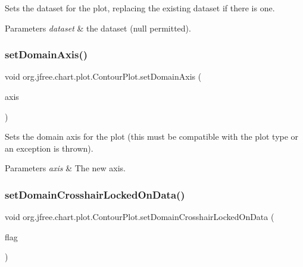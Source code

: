 Sets the dataset for the plot, replacing the existing dataset if there is one.


\begin{DoxyParams}{Parameters}
{\em dataset} & the dataset ({\ttfamily null} permitted). \\
\hline
\end{DoxyParams}
\mbox{\label{classorg_1_1jfree_1_1chart_1_1plot_1_1_contour_plot_a9daa2294c4efa2a5e58fafc7c6e723a5}} 
\subsubsection{\texorpdfstring{set\+Domain\+Axis()}{setDomainAxis()}}
{\footnotesize\ttfamily void org.\+jfree.\+chart.\+plot.\+Contour\+Plot.\+set\+Domain\+Axis (\begin{DoxyParamCaption}\item[{\mbox{\hyperlink{classorg_1_1jfree_1_1chart_1_1axis_1_1_value_axis}{Value\+Axis}}}]{axis }\end{DoxyParamCaption})}

Sets the domain axis for the plot (this must be compatible with the plot type or an exception is thrown).


\begin{DoxyParams}{Parameters}
{\em axis} & The new axis. \\
\hline
\end{DoxyParams}
\mbox{\label{classorg_1_1jfree_1_1chart_1_1plot_1_1_contour_plot_aa2c25a282ecd66b55e4420483bac346a}} 
\subsubsection{\texorpdfstring{set\+Domain\+Crosshair\+Locked\+On\+Data()}{setDomainCrosshairLockedOnData()}}
{\footnotesize\ttfamily void org.\+jfree.\+chart.\+plot.\+Contour\+Plot.\+set\+Domain\+Crosshair\+Locked\+On\+Data (\begin{DoxyParamCaption}\item[{boolean}]{flag }\end{DoxyParamCaption})}


